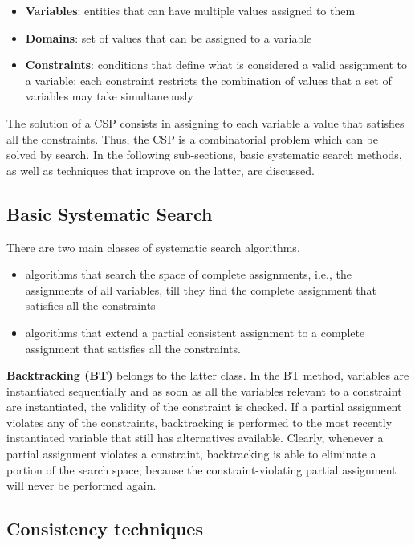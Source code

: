 \begin{itemize}
    \item \textbf{Variables}: entities that can have multiple values assigned to them
    \item \textbf{Domains}: set of values that can be assigned to a variable
    \item \textbf{Constraints}: conditions that define what is considered a valid assignment to a variable; each constraint restricts the combination of values that a set of variables may take simultaneously
\end{itemize}

The solution of a CSP consists in assigning to each variable a value that satisfies all the constraints. Thus, the CSP is a combinatorial problem which can be solved by search. In the following sub-sections, basic systematic search methods, as well as techniques that improve on the latter, are discussed.

\subsection{Basic Systematic Search}

There are two main classes of systematic search algorithms.

\begin{itemize}
    \item algorithms that search the space of complete assignments, i.e., the assignments of all variables, till they find the complete assignment that satisfies all the constraints
    \item algorithms that extend a partial consistent assignment to a complete assignment that satisfies all the constraints.
\end{itemize}

\textbf{Backtracking (BT)} belongs to the latter class. In the BT method, variables are instantiated sequentially and as soon as all the variables relevant to a constraint are instantiated, the validity of the constraint is checked. If a partial assignment violates any of the constraints, backtracking is performed to the most recently instantiated variable that still has alternatives available. Clearly, whenever a partial assignment violates a constraint, backtracking is able to eliminate a portion of the search space, because the constraint-violating partial assignment will never be performed again.

\subsection{Consistency techniques}


